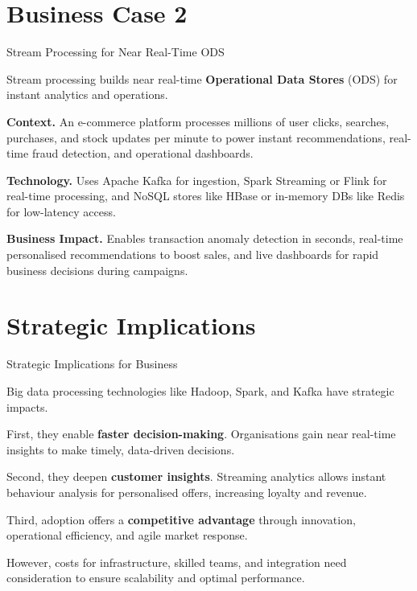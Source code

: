 \documentclass[aspectratio=169, table]{beamer}
\begin{document}
\section{Business Case 2}
\begin{frame}{Stream Processing for Near Real-Time ODS}
	\vspace{20pt}
	
	Stream processing builds near real-time \textbf{Operational Data Stores} (ODS) for instant analytics and operations.
	
	\vspace{10pt}
	\textbf{Context.} An e-commerce platform processes millions of user clicks, searches, purchases, and stock updates per minute to power instant recommendations, real-time fraud detection, and operational dashboards.
	
	\vspace{10pt}
	\textbf{Technology.} Uses Apache Kafka for ingestion, Spark Streaming or Flink for real-time processing, and NoSQL stores like HBase or in-memory DBs like Redis for low-latency access.
	
	\vspace{10pt}
	\textbf{Business Impact.} Enables transaction anomaly detection in seconds, real-time personalised recommendations to boost sales, and live dashboards for rapid business decisions during campaigns.
	
\end{frame}


\section{Strategic Implications}
\begin{frame}{Strategic Implications for Business}
	\vspace{20pt}
	
	Big data processing technologies like Hadoop, Spark, and Kafka have strategic impacts.
	
	\vspace{10pt}
	First, they enable \textbf{faster decision-making}. Organisations gain near real-time insights to make timely, data-driven decisions.
	
	\vspace{10pt}
	Second, they deepen \textbf{customer insights}. Streaming analytics allows instant behaviour analysis for personalised offers, increasing loyalty and revenue.
	
	\vspace{10pt}
	Third, adoption offers a \textbf{competitive advantage} through innovation, operational efficiency, and agile market response.
	
	\vspace{10pt}
	However, costs for infrastructure, skilled teams, and integration need consideration to ensure scalability and optimal performance.
	
\end{frame}
\end{document}
